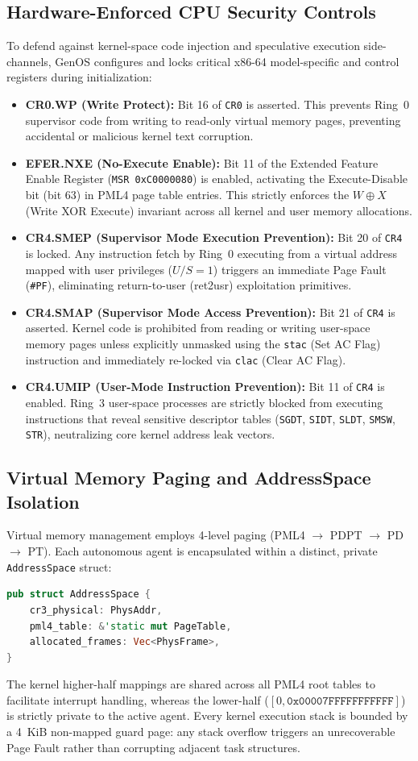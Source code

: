 \documentclass[10pt,journal,compsoc]{IEEEtran}
\theoremstyle{definition}
\begin{document}
\subsection{Hardware-Enforced CPU Security Controls}
To defend against kernel-space code injection and speculative execution side-channels, GenOS configures and locks critical x86-64 model-specific and control registers during initialization:
\begin{itemize}
    \item \textbf{CR0.WP (Write Protect):} Bit 16 of \texttt{CR0} is asserted. This prevents Ring~0 supervisor code from writing to read-only virtual memory pages, preventing accidental or malicious kernel text corruption.
    \item \textbf{EFER.NXE (No-Execute Enable):} Bit 11 of the Extended Feature Enable Register (\texttt{MSR 0xC0000080}) is enabled, activating the Execute-Disable bit (bit 63) in PML4 page table entries. This strictly enforces the $W \oplus X$ (Write XOR Execute) invariant across all kernel and user memory allocations.
    \item \textbf{CR4.SMEP (Supervisor Mode Execution Prevention):} Bit 20 of \texttt{CR4} is locked. Any instruction fetch by Ring~0 executing from a virtual address mapped with user privileges ($U/S = 1$) triggers an immediate Page Fault (\texttt{\#PF}), eliminating return-to-user (ret2usr) exploitation primitives.
    \item \textbf{CR4.SMAP (Supervisor Mode Access Prevention):} Bit 21 of \texttt{CR4} is asserted. Kernel code is prohibited from reading or writing user-space memory pages unless explicitly unmasked using the \texttt{stac} (Set AC Flag) instruction and immediately re-locked via \texttt{clac} (Clear AC Flag).
    \item \textbf{CR4.UMIP (User-Mode Instruction Prevention):} Bit 11 of \texttt{CR4} is enabled. Ring~3 user-space processes are strictly blocked from executing instructions that reveal sensitive descriptor tables (\texttt{SGDT}, \texttt{SIDT}, \texttt{SLDT}, \texttt{SMSW}, \texttt{STR}), neutralizing core kernel address leak vectors.
\end{itemize}

\subsection{Virtual Memory Paging and AddressSpace Isolation}
Virtual memory management employs 4-level paging (PML4 $\rightarrow$ PDPT $\rightarrow$ PD $\rightarrow$ PT). Each autonomous agent is encapsulated within a distinct, private \texttt{AddressSpace} struct:
\begin{lstlisting}[language=Rust]
pub struct AddressSpace {
    cr3_physical: PhysAddr,
    pml4_table: &'static mut PageTable,
    allocated_frames: Vec<PhysFrame>,
}
\end{lstlisting}
The kernel higher-half mappings are shared across all PML4 root tables to facilitate interrupt handling, whereas the lower-half ($[0, \texttt{0x00007FFFFFFFFFFF}]$) is strictly private to the active agent. Every kernel execution stack is bounded by a 4~KiB non-mapped guard page: any stack overflow triggers an unrecoverable Page Fault rather than corrupting adjacent task structures.
\end{document}

